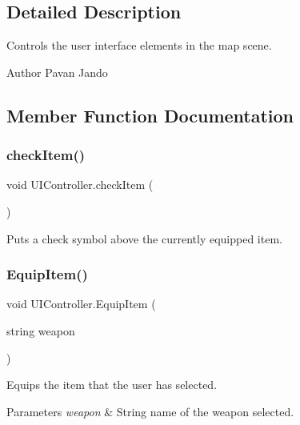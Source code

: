 \subsection{Detailed Description}
Controls the user interface elements in the map scene. 

\begin{DoxyAuthor}{Author}
Pavan Jando
\end{DoxyAuthor}


\subsection{Member Function Documentation}
\mbox{\label{class_u_i_controller_a9ea46066b8e67d6f3c65a69e94ad3b53}} 
\subsubsection{\texorpdfstring{checkItem()}{checkItem()}}
{\footnotesize\ttfamily void U\+I\+Controller.\+check\+Item (\begin{DoxyParamCaption}{ }\end{DoxyParamCaption})\hspace{0.3cm}{\ttfamily [private]}}



Puts a check symbol above the currently equipped item. 

\mbox{\label{class_u_i_controller_a27a528e3022c45a9b94cce0d9b072762}} 
\subsubsection{\texorpdfstring{EquipItem()}{EquipItem()}}
{\footnotesize\ttfamily void U\+I\+Controller.\+Equip\+Item (\begin{DoxyParamCaption}\item[{string}]{weapon }\end{DoxyParamCaption})}



Equips the item that the user has selected. 


\begin{DoxyParams}{Parameters}
{\em weapon} & String name of the weapon selected.\\
\hline
\end{DoxyParams}
\mbox{\label{class_u_i_controller_a18e9df9cf6f6b018a0c9e2baa8f4e0c9}} 

